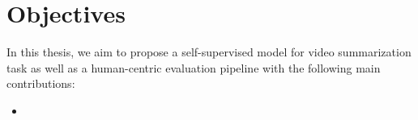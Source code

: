 \section{Objectives}
\label{section:intro-objectives}

In this thesis, we aim to propose a self-supervised model for video summarization task as well as a human-centric evaluation pipeline with the following main contributions:

\begin{itemize}
  \item 
\end{itemize}